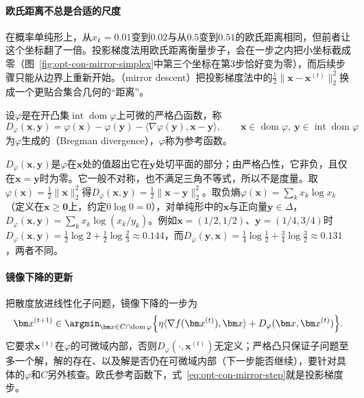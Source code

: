 \paragraph{欧氏距离不总是合适的尺度}
在概率单纯形上，从$x_k=0.01$变到$0.02$与从$0.5$变到$0.51$的欧氏距离相同，但前者让这个坐标翻了一倍。投影梯度法用欧氏距离衡量步子，会在一步之内把小坐标截成零（图~\ref{fig:opt-con-mirror-simplex}中第三个坐标在第3步恰好变为零），而后续步骤只能从边界上重新开始。（mirror descent）把投影梯度法中的$\frac12\lVert\bm x-\bm x^{(t)}\rVert_2^2$换成一个更贴合集合几何的“距离”。

\begin{definition}[Bregman散度]
\label{def:opt-con-bregman}
设$\varphi$是在开凸集$\operatorname{int}\operatorname{dom}\varphi$上可微的严格凸函数，称
\[
  D_\varphi(\bm x,\bm y)=\varphi(\bm x)-\varphi(\bm y)-\langle\nabla\varphi(\bm y),\bm x-\bm y\rangle,\qquad\bm x\in\operatorname{dom}\varphi,\ \bm y\in\operatorname{int}\operatorname{dom}\varphi
\]
为$\varphi$生成的（Bregman divergence），$\varphi$称为参考函数。
\end{definition}

$D_\varphi(\bm x,\bm y)$是$\varphi$在$\bm x$处的值超出它在$\bm y$处切平面的部分；由严格凸性，它非负，且仅在$\bm x=\bm y$时为零。它一般不对称，也不满足三角不等式，所以不是度量。取$\varphi(\bm x)=\frac12\lVert\bm x\rVert_2^2$得$D_\varphi(\bm x,\bm y)=\frac12\lVert\bm x-\bm y\rVert_2^2$。取负熵$\varphi(\bm x)=\sum_kx_k\log x_k$（定义在$\bm x\geq\bm0$上，约定$0\log0=0$），对单纯形中的$\bm x$与正向量$\bm y\in\Delta$，$D_\varphi(\bm x,\bm y)=\sum_kx_k\log(x_k/y_k)$。例如$\bm x=(1/2,1/2)$、$\bm y=(1/4,3/4)$时$D_\varphi(\bm x,\bm y)=\frac12\log2+\frac12\log\frac23\approx0.144$，而$D_\varphi(\bm y,\bm x)=\frac14\log\frac12+\frac34\log\frac32\approx0.131$，两者不同。

\paragraph{镜像下降的更新}
把散度放进线性化子问题，镜像下降的一步为
\begin{equation}
\label{eq:opt-con-mirror-step}
  \bm x^{(t+1)}\in\argmin_{\bm x\in C\cap\operatorname{dom}\varphi}\Bigl\{\eta\langle\nabla f(\bm x^{(t)}),\bm x\rangle+D_\varphi(\bm x,\bm x^{(t)})\Bigr\}.
\end{equation}
它要求$\bm x^{(t)}$在$\varphi$的可微域内部，否则$D_\varphi(\cdot,\bm x^{(t)})$无定义；严格凸只保证子问题至多一个解，解的存在、以及解是否仍在可微域内部（下一步能否继续），要针对具体的$\varphi$和$C$另外核查。欧氏参考函数下，式~\eqref{eq:opt-con-mirror-step}就是投影梯度步。

